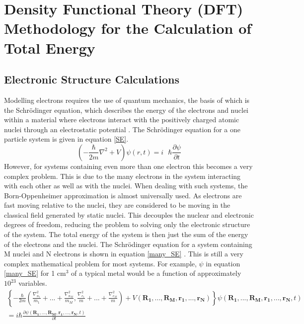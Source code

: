 \chapter{Density Functional Theory (DFT) Methodology for the Calculation of Total Energy}\label{DFT_methods}

\section*{Electronic Structure Calculations}
Modelling electrons requires the use of quantum mechanics, the basis of which is the 
Schr{\"o}dinger equation, which describes the energy of the electrons and nuclei within a material where electrons interact with the positively charged atomic nuclei through an electrostatic potential \cite{Lesar}. The Schr{\"o}dinger equation for a one particle system is given in equation \ref{SE}.
\begin{equation} \label{SE}
\left( - \frac{\hbar}{2m} \nabla^2 + \hat{V} \right)\psi(r,t) = i\text{ } \hbar\frac{\partial \psi}{\partial t}
\end{equation}
However, for systems containing even more than one electron this becomes a very complex problem. This is due to the many electrons in the system interacting with each other as well as with the nuclei. When dealing with such systems, the Born-Oppenheimer approximation is almost universally used. As electrons are fast moving relative to the nuclei, they are considered to be moving in the classical field generated by static nuclei. This decouples the nuclear and electronic degrees of freedom, reducing the problem to solving only the electronic structure of the system. The total energy of the system is then just the sum of the energy of the electrons and the nuclei. The Schr{\"o}dinger equation for a system containing M nuclei and N electrons is shown in equation \ref{many_SE} \cite{Lesar}. This is still a very complex mathematical problem for most systems. For example, $\psi$ in equation \ref{many_SE} for 1 cm$^3$ of a typical metal would be a function of approximately $10^{23}$ variables.
\begin{multline}  \label{many_SE}
\left\{ - \frac{\hbar}{2m} \left( \frac{\nabla_{n_1}^2}{m_1} + ... + \frac{\nabla_{n_M}^2}{m_M}, 
\frac{\nabla_{e_1}^2}{m} + ... + \frac{\nabla_{e_M}^2}{m} \right)
+ V \left( \mathbf{R_1},...,\mathbf{R_M}, \mathbf{r_1}, ..., \mathbf{r_N} \right)
\right\}
\psi (\mathbf{R_1},...,\mathbf{R_M}, \mathbf{r_1}, ..., \mathbf{r_N}, t) \\
= i\hbar \frac{\partial\psi(\mathbf{R_1},...,\mathbf{R_M}, \mathbf{r_1}, ..., \mathbf{r_N},t)}{\partial t}
\end{multline}


